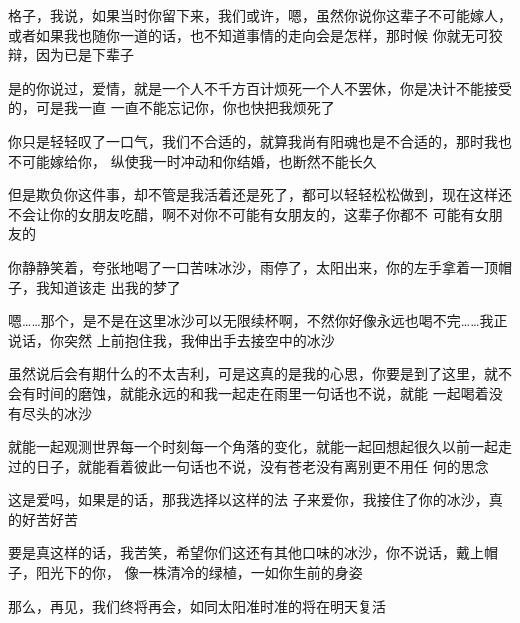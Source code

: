\documentclass{article}
\begin{document}
格子，我说，如果当时你留下来，我们或许，嗯，虽然你说你这辈子不可能嫁人，或者如果我也随你一道的话，也不知道事情的走向会是怎样，那时候
你就无可狡辩，因为已是下辈子 

是的你说过，爱情，就是一个人不千方百计烦死一个人不罢休，你是决计不能接受的，可是我一直
一直不能忘记你，你也快把我烦死了 

你只是轻轻叹了一口气，我们不合适的，就算我尚有阳魂也是不合适的，那时我也不可能嫁给你，
纵使我一时冲动和你结婚，也断然不能长久 

但是欺负你这件事，却不管是我活着还是死了，都可以轻轻松松做到，现在这样还不会让你的女朋友吃醋，啊不对你不可能有女朋友的，这辈子你都不
可能有女朋友的 

\newpage

你静静笑着，夸张地喝了一口苦味冰沙，雨停了，太阳出来，你的左手拿着一顶帽子，我知道该走
出我的梦了 

嗯……那个，是不是在这里冰沙可以无限续杯啊，不然你好像永远也喝不完……我正说话，你突然
上前抱住我，我伸出手去接空中的冰沙 

虽然说后会有期什么的不太吉利，可是这真的是我的心思，你要是到了这里，就不会有时间的磨蚀，就能永远的和我一起走在雨里一句话也不说，就能
一起喝着没有尽头的冰沙 

就能一起观测世界每一个时刻每一个角落的变化，就能一起回想起很久以前一起走过的日子，就能看着彼此一句话也不说，没有苍老没有离别更不用任
何的思念 

这是爱吗，如果是的话，那我选择以这样的法
子来爱你，我接住了你的冰沙，真的好苦好苦 

\newpage

要是真这样的话，我苦笑，希望你们这还有其他口味的冰沙，你不说话，戴上帽子，阳光下的你，
像一株清冷的绿植，一如你生前的身姿 

那么，再见，我们终将再会，如同太阳准时准的将在明天复活
\end{document}
